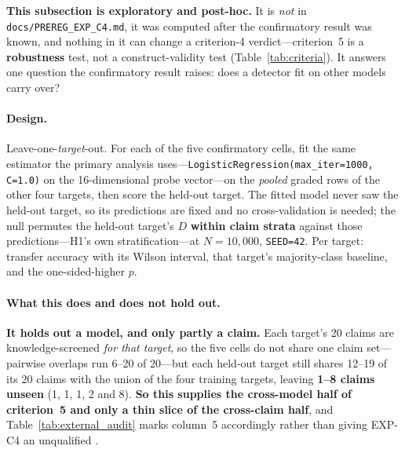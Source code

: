 \textbf{This subsection is exploratory and post-hoc.} It is \emph{not} in \texttt{docs/PREREG\_EXP\_C4.md}, it was computed after the confirmatory result was known, and nothing in it can change a criterion-4 verdict---criterion~5 is a \textbf{robustness} test, not a construct-validity test (Table~\ref{tab:criteria}). It answers one question the confirmatory result raises: does a detector fit on other models carry over?

\paragraph{Design.} Leave-one-\emph{target}-out. For each of the five confirmatory cells, fit the same estimator the primary analysis uses---\texttt{LogisticRegression(max\_iter=1000, C=1.0)} on the 16-dimensional probe vector---on the \emph{pooled} graded rows of the other four targets, then score the held-out target. The fitted model never saw the held-out target, so its predictions are fixed and no cross-validation is needed; the null permutes the held-out target's $D$ \textbf{within claim strata} against those predictions---H1's own stratification---at $N\!=\!10{,}000$, \texttt{SEED=42}. Per target: transfer accuracy with its Wilson interval, that target's majority-class baseline, and the one-sided-higher $p$.

\paragraph{What this does and does not hold out.} \textbf{It holds out a model, and only partly a claim.} Each target's 20 claims are knowledge-screened \emph{for that target}, so the five cells do not share one claim set---pairwise overlaps run 6--20 of 20---but each held-out target still shares 12--19 of its 20 claims with the union of the four training targets, leaving \textbf{1--8 claims unseen} (1, 1, 1, 2 and 8). \textbf{So this supplies the cross-model half of criterion~5 and only a thin slice of the cross-claim half}, and Table~\ref{tab:external_audit} marks column~5 accordingly rather than giving EXP-C4 an unqualified \checkmark.

